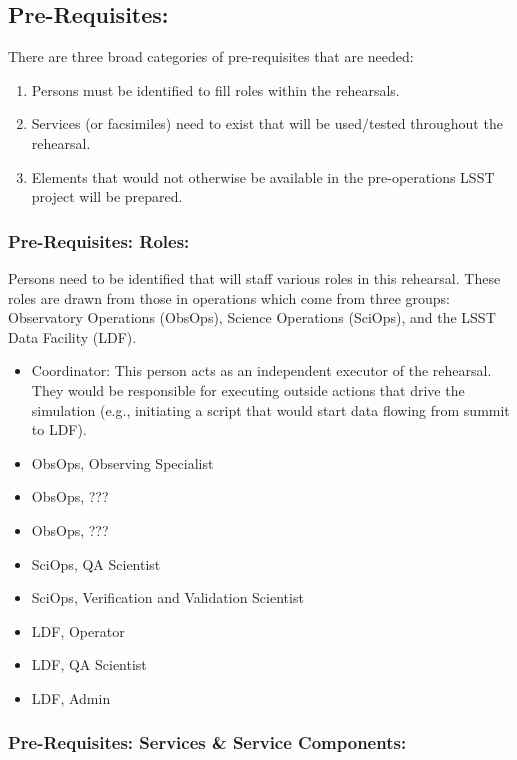 \clearpage
\subsection{Pre-Requisites:}

There are three broad categories of pre-requisites that are needed:
\begin{enumerate}
\item Persons must be identified to fill roles within the rehearsals.
\item Services (or facsimiles) need to exist that will be used/tested throughout the 
rehearsal.
\item Elements that would not otherwise 
be available in the pre-operations LSST project will be prepared.
\end{enumerate}
 
\subsubsection{Pre-Requisites: Roles:}

Persons need to be identified that will staff various roles in this 
rehearsal.  These roles are drawn from those in operations which come
from three groups: Observatory Operations (ObsOps), Science Operations 
(SciOps), and the LSST Data Facility (LDF).
\begin{itemize}[topsep=-8pt]
\item Coordinator:  This person acts as an independent executor of the 
rehearsal.  They would be responsible for executing outside actions that drive the 
simulation (e.g., initiating a script that would start data flowing from 
summit to LDF).
\item ObsOps, Observing Specialist
\item ObsOps, ???
\item ObsOps, ???
\item SciOps, QA Scientist
\item SciOps, Verification and Validation Scientist
\item LDF, Operator
\item LDF, QA Scientist
\item LDF, Admin
\end{itemize}

\subsubsection{Pre-Requisites: Services \& Service Components:}

